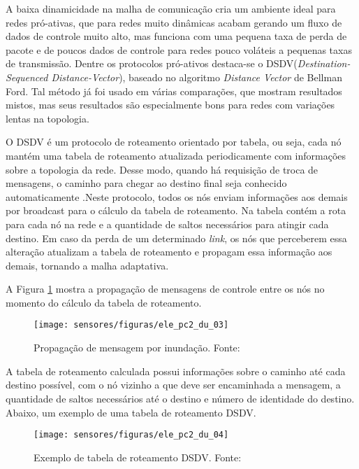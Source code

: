 A baixa dinamicidade na malha de comunicação cria um ambiente ideal para redes pró-ativas, que para redes muito dinâmicas acabam gerando um fluxo de dados de controle muito alto, mas funciona com uma pequena taxa de perda de pacote e de poucos dados de controle para redes pouco voláteis a pequenas taxas de transmissão. Dentre os protocolos pró-ativos destaca-se o DSDV(\emph{Destination-Sequenced Distance-Vector}), baseado no algoritmo \emph{Distance Vector} de Bellman Ford. Tal método já foi usado em várias comparações, que mostram resultados mistos, mas seus resultados são especialmente bons para redes com variações lentas na topologia.\cite{bib_ele_du_6}

O DSDV é um protocolo de roteamento orientado por tabela, ou seja, cada nó mantém uma tabela de roteamento atualizada periodicamente com informações sobre a topologia da rede. Desse modo, quando há requisição de troca de mensagens, o caminho para chegar ao destino final seja conhecido automaticamente \cite{bib_ele_du_3}.Neste protocolo, todos os nós enviam informações aos demais por broadcast para o cálculo da tabela de roteamento. Na tabela contém a rota para cada nó na rede e a quantidade de saltos necessários para atingir cada destino. Em caso da perda de um determinado \emph{link}, os nós que perceberem essa alteração atualizam a tabela de roteamento e propagam essa informação aos demais, tornando a malha adaptativa.


A Figura \ref{ele_pc2_du_03} mostra a propagação de mensagens de controle entre os nós no momento do cálculo da tabela de roteamento.


\begin{figure}[H]
\centering
\texttt{[image: sensores/figuras/ele\_pc2\_du\_03]}
\caption{Propagação de mensagem por inundação. Fonte:\cite{bib_ele_du_3}}
\label{ele_pc2_du_03}
\end{figure}

A tabela de roteamento calculada possui informações sobre o caminho até cada destino possível, com o nó vizinho a que deve ser encaminhada a mensagem, a quantidade de saltos necessários até o destino e número de identidade do destino. Abaixo, um exemplo de uma tabela de roteamento DSDV.


\begin{figure}[H]
\centering
\texttt{[image: sensores/figuras/ele\_pc2\_du\_04]}
\caption{Exemplo de tabela de roteamento DSDV. Fonte:\cite{bib_ele_du_3}}
\label{ele_pc2_du_04}
\end{figure}

